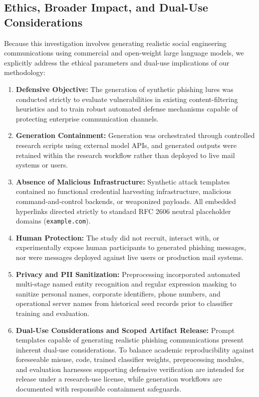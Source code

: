 \documentclass[journal]{IEEEtran}
\begin{document}
\subsection{Ethics, Broader Impact, and Dual-Use Considerations}
\label{sec:ethics}
Because this investigation involves generating realistic social engineering communications using commercial and open-weight large language models, we explicitly address the ethical parameters and dual-use implications of our methodology:
\begin{enumerate}
    \item \textbf{Defensive Objective:} The generation of synthetic phishing lures was conducted strictly to evaluate vulnerabilities in existing content-filtering heuristics and to train robust automated defense mechanisms capable of protecting enterprise communication channels.
    \item \textbf{Generation Containment:} Generation was orchestrated through controlled research scripts using external model APIs, and generated outputs were retained within the research workflow rather than deployed to live mail systems or users.
    \item \textbf{Absence of Malicious Infrastructure:} Synthetic attack templates contained no functional credential harvesting infrastructure, malicious command-and-control backends, or weaponized payloads. All embedded hyperlinks directed strictly to standard RFC 2606 neutral placeholder domains (\texttt{example.com}).
    \item \textbf{Human Protection:} The study did not recruit, interact with, or experimentally expose human participants to generated phishing messages, nor were messages deployed against live users or production mail systems.
    \item \textbf{Privacy and PII Sanitization:} Preprocessing incorporated automated multi-stage named entity recognition and regular expression masking to sanitize personal names, corporate identifiers, phone numbers, and operational server names from historical seed records prior to classifier training and evaluation.
    \item \textbf{Dual-Use Considerations and Scoped Artifact Release:} Prompt templates capable of generating realistic phishing communications present inherent dual-use considerations. To balance academic reproducibility against foreseeable misuse, code, trained classifier weights, preprocessing modules, and evaluation harnesses supporting defensive verification are intended for release under a research-use license, while generation workflows are documented with responsible containment safeguards.
\end{enumerate}
\end{document}
